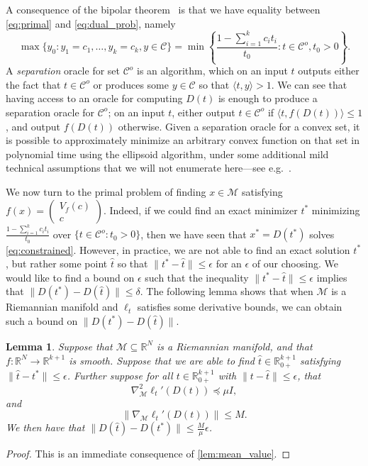 \documentclass{article}
\numberwithin{equation}{section}
\newcommand{\R}{\mathbb{R}}
\newtheorem{lemma}{Lemma}[section]
\newcommand{\Rplus}{\R_{0+}}
\newcommand{\cM}{{\mathcal{M}}}
\newcommand{\cC}{\mathcal{C}}
\begin{document}
A consequence of
the bipolar theorem~\cite[Ch.~IV, (1.2)]{barvinok}
is that we have equality between \eqref{eq:primal} and \eqref{eq:dual_prob}, namely
\[
    \max \{y_0 : y_1 = c_1, \dots, y_k = c_k, y \in \cC\} = \min \left\{\frac{1 - \sum_{i=1}^{k} c_i t_i}{t_0} : t \in \cC^o, t_0 > 0\right\}.
\]
A \emph{separation} oracle for set $\cC^o$ is an algorithm, which on an input $t$ outputs either the fact that $t \in \cC^o$ or produces some $y \in \cC$ so that $\langle t, y \rangle > 1$.
We can see that having access to an oracle for computing $D(t)$ is enough to produce a separation oracle for $\cC^o$; on an input $t$, either output $t \in \cC^o$ if $\langle t, f(D(t)) \rangle \le 1$, and output $f(D(t))$ otherwise.
Given a separation oracle for a convex set, it is possible to approximately minimize an arbitrary convex function on that set in polynomial time using the ellipsoid algorithm, under some additional mild technical assumptions that we will not enumerate here---see e.g.~\cite[\S 5.2]{ben2001lectures}.

We now turn to the primal problem of finding $x \in \cM$ satisfying $f(x) = \begin{pmatrix} V_f(c) \\ c\end{pmatrix}$.
Indeed, if we could find an exact minimizer $t^*$ minimizing $\frac{1 - \sum_{i=1}^{k} c_i t_i}{t_0}$ over $\{t \in \cC^o : t_0 > 0\}$, then we have seen that $x^* = D(t^*)$ solves \eqref{eq:constrained}. However, in practice, we are not able to find an exact solution $t^*$, but rather some point $\hat{t}$ so that $\|t^* - \hat{t}\| \le \epsilon$ for an $\epsilon$ of our choosing. We would like to find a bound on $\epsilon$ such that the inequality $\|t^* - \hat{t}\| \le \epsilon$ implies that $\|D(t^*) - D(\hat{t})\| \le \delta$. The following lemma shows that when $\cM$ is a Riemannian manifold and $\ell_t$ satisfies some derivative bounds, we can obtain such a bound on $\|D(t^*) - D(\hat{t})\|$.

\begin{lemma}
    Suppose that $\cM \subseteq \R^N$ is a Riemannian manifold, and that $f : \R^N \rightarrow \R^{k+1}$ is smooth.
    Suppose that we are able to find $\hat{t} \in \Rplus^{k+1}$ satisfying $\|\hat{t} - t^*\| \le \epsilon$.
    Further suppose for all $t \in \Rplus^{k+1}$ with $\|t - \hat{t}\| \le \epsilon$,  that
    \[
        \nabla_{\cM}^2 \ell_t'(D(t)) \preceq \mu I,
    \]
    and
    \[
        \|\nabla_{\cM} \ell_t'(D(t))\| \le M.
    \]
    We then have that $\|D(\hat{t}) - D(t^*)\|\le \frac{M}{\mu}\epsilon$.
\end{lemma}
\begin{proof}
    This is an immediate consequence of \cref{lem:mean_value}.
\end{proof}
\end{document}
